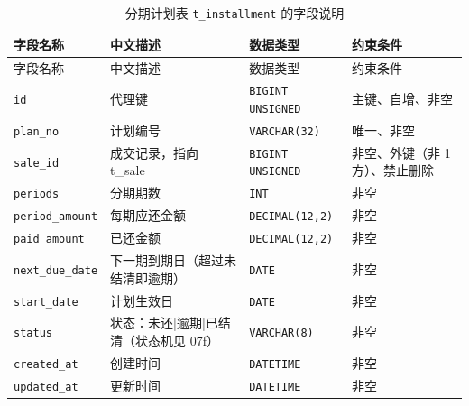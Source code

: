 \documentclass[12pt, a4paper]{ctexart}
\newcommand{\code}[1]{\texttt{\small #1}}
\begin{document}
\begin{longtable}{@{}p{3.1cm} p{4.5cm} p{2.4cm} p{4.5cm}@{}}
\caption{分期计划表 \code{t\_installment} 的字段说明}\label{tab:f-t-installment}\\
\toprule
字段名称 & 中文描述 & 数据类型 & 约束条件 \\
\midrule
\endfirsthead
\toprule
字段名称 & 中文描述 & 数据类型 & 约束条件 \\
\midrule
\endhead
\bottomrule
\endlastfoot
\code{id} & 代理键 & \code{BIGINT UNSIGNED} & 主键、自增、非空 \\
\code{plan\_no} & 计划编号 & \code{VARCHAR(32)} & 唯一、非空 \\
\code{sale\_id} & 成交记录，指向 t\_sale & \code{BIGINT UNSIGNED} & 非空、外键（非 1 方）、禁止删除 \\
\code{periods} & 分期期数 & \code{INT} & 非空 \\
\code{period\_amount} & 每期应还金额 & \code{DECIMAL(12,2)} & 非空 \\
\code{paid\_amount} & 已还金额 & \code{DECIMAL(12,2)} & 非空 \\
\code{next\_due\_date} & 下一期到期日（超过未结清即逾期） & \code{DATE} & 非空 \\
\code{start\_date} & 计划生效日 & \code{DATE} & 非空 \\
\code{status} & 状态：未还|逾期|已结清（状态机见 07f） & \code{VARCHAR(8)} & 非空 \\
\code{created\_at} & 创建时间 & \code{DATETIME} & 非空 \\
\code{updated\_at} & 更新时间 & \code{DATETIME} & 非空 \\
\end{longtable}
\end{document}
